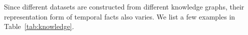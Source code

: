 Since different datasets are constructed from different knowledge graphs, their representation form of temporal facts also varies. We list a few examples in Table~\ref {tab:knowledge}. 
